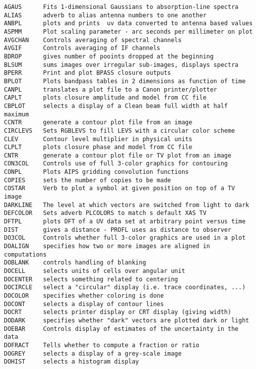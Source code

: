 
\vskip 0.5pt
\bbve\begin{verbatim}
AGAUS      Fits 1-dimensional Gaussians to absorption-line spectra
ALIAS      adverb to alias antenna numbers to one another
ANBPL      plots and prints  uv data converted to antenna based values
ASPMM      Plot scaling parameter - arc seconds per millimeter on plot
AVGCHAN    Controls averaging of spectral channels
AVGIF      Controls averaging of IF channels
BDROP      gives number of pooints dropped at the beginning
BLSUM      sums images over irregular sub-images, displays spectra
BPERR      Print and plot BPASS closure outputs
BPLOT      Plots bandpass tables in 2 dimensions as function of time
CANPL      translates a plot file to a Canon printer/plotter
CAPLT      plots closure amplitude and model from CC file
CBPLOT     selects a display of a Clean beam full width at half maximum
CCNTR      generate a contour plot file from an image
CIRCLEVS   Sets RGBLEVS to fill LEVS with a circular color scheme
CLEV       Contour level multiplier in physical units
CLPLT      plots closure phase and model from CC file
CNTR       generate a contour plot file or TV plot from an image
CON3COL    Controls use of full 3-color graphics for contouring
CONPL      Plots AIPS gridding convolution functions
COPIES     sets the number of copies to be made
COSTAR     Verb to plot a symbol at given position on top of a TV image
DARKLINE   The level at which vectors are switched from light to dark
DEFCOLOR   Sets adverb PLCOLORS to match s default XAS TV
DFTPL      plots DFT of a UV data set at arbitrary point versus time
DIST       gives a distance - PROFL uses as distance to observer
DO3COL     Controls whether full 3-color graphics are used in a plot
DOALIGN    specifies how two or more images are aligned in computations
DOBLANK    controls handling of blanking
DOCELL     selects units of cells over angular unit
DOCENTER   selects something related to centering
DOCIRCLE   select a "circular" display (i.e. trace coordinates, ...)
DOCOLOR    specifies whether coloring is done
DOCONT     selects a display of contour lines
DOCRT      selects printer display or CRT display (giving width)
DODARK     specifies whether "dark" vectors are plotted dark or light
DOEBAR     Controls display of estimates of the uncertainty in the data
DOFRACT    Tells whether to compute a fraction or ratio
DOGREY     selects a display of a grey-scale image
DOHIST     selects a histogram display

\end{verbatim}
